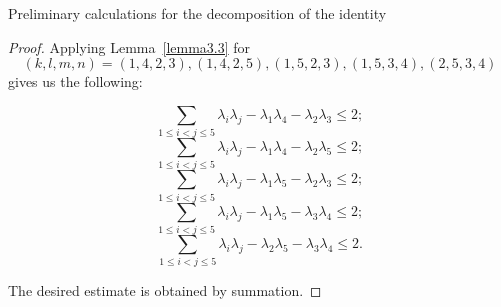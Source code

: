 \documentclass[12pt]{article}
\begin{document}
\begin{section}{Preliminary calculations for the decomposition of the identity }
    \begin{proof}
        Applying Lemma~\ref{lemma3.3} for $$(k,l,m,n) = (1,4,2,3),
        (1,4,2,5),(1,5,2,3), (1,5,3,4), (2,5,3,4)$$ gives us the following:

        $$
            \sum_{1\leq i<j\leq 5}\lambda_{i}\lambda_{j} - \lambda_{1}\lambda_{4} - \lambda_{2}\lambda_{3}\leq 2;
        $$
        $$
            \sum_{1\leq i<j\leq 5}\lambda_{i}\lambda_{j} - \lambda_{1}\lambda_{4} - \lambda_{2}\lambda_{5}\leq 2;
        $$
        $$
            \sum_{1\leq i<j\leq 5}\lambda_{i}\lambda_{j} - \lambda_{1}\lambda_{5} - \lambda_{2}\lambda_{3}\leq 2;
        $$
        $$
            \sum_{1\leq i<j\leq 5}\lambda_{i}\lambda_{j} - \lambda_{1}\lambda_{5} - \lambda_{3}\lambda_{4}\leq 2;
        $$
        $$
            \sum_{1\leq i<j\leq 5}\lambda_{i}\lambda_{j} - \lambda_{2}\lambda_{5} - \lambda_{3}\lambda_{4}\leq 2.
        $$

        The desired estimate is obtained by summation.
        
    \end{proof}
    
    
\end{section}
\end{document}
